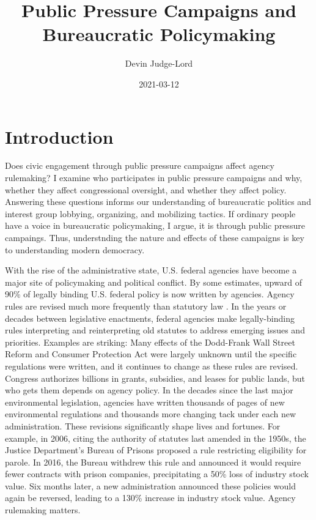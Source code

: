 \documentclass[
]{book}
\title{Public Pressure Campaigns and Bureaucratic Policymaking}
\author{Devin Judge-Lord}
\date{2021-03-12}
\begin{document}
\maketitle

{
\setcounter{tocdepth}{1}
\tableofcontents
}
\hypertarget{introduction}{%
\chapter*{Introduction}\label{introduction}}

Does civic engagement through public pressure campaigns affect agency rulemaking? I examine who participates in public pressure campaigns and why, whether they affect congressional oversight, and whether they affect policy. Answering these questions informs our understanding of bureaucratic politics and interest group lobbying, organizing, and mobilizing tactics. If ordinary people have a voice in bureaucratic policymaking, I argue, it is through public pressure campaings. Thus, understnding the nature and effects of these campaigns is key to understanding modern democracy.

With the rise of the administrative state, U.S. federal agencies have
become a major site of policymaking and political conflict. By some
estimates, upward of 90\% of legally binding U.S. federal policy is now
written by agencies. Agency rules are revised much more frequently than
statutory law \citep{Wagner2017}. In the years or decades between
legislative enactments, federal agencies make legally-binding rules
interpreting and reinterpreting old statutes to address emerging issues
and priorities. Examples are striking: Many effects of the Dodd-Frank Wall
Street Reform and Consumer Protection Act were largely unknown until the
specific regulations were written, and it continues to change as these
rules are revised. Congress authorizes billions in grants, subsidies, and
leases for public lands, but who gets them depends on agency policy. In
the decades since the last major environmental legislation, agencies
have written thousands of pages of new environmental regulations and
thousands more changing tack under each new administration. These
revisions significantly shape lives and fortunes. For example, in 2006,
citing the authority of statutes last amended in the 1950s, the Justice
Department's Bureau of Prisons proposed a rule restricting eligibility
for parole. In 2016, the Bureau withdrew this rule and announced it
would require fewer contracts with prison companies,
precipitating a 50\% loss of industry stock value. Six months later, a
new administration announced these policies would again be reversed,
leading to a 130\% increase in industry stock value. Agency rulemaking
matters.
\end{document}
